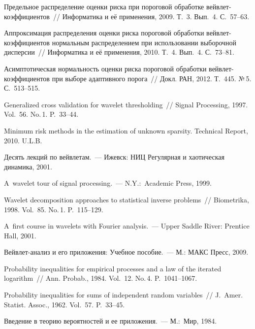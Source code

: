 \begin{multicols}{2}
{{\begin{thebibliography}{99}
 Предельное распределение оценки риска при пороговой обработке вейв\-лет-ко\-эф\-фи\-ци\-ен\-тов~// 
Информатика и её применения, 2009. Т.~3. Вып.~4. С.~57--63.

 Аппроксимация распределения оценки риска пороговой обработки вейв\-лет-ко\-эф\-фи\-ци\-ен\-тов 
нормальным распределением при использовании выборочной дисперсии~// Информатика и её применения, 2010. Т.~4. Вып.~4. С.~73--81.

 Асимптотическая нормальность оценки риска пороговой обработки вейв\-лет-ко\-эф\-фи\-ци\-ентов при 
выборе адаптивного порога~// Докл. РАН, 2012. Т.~445. №\,5. С.~513--515.



 Generalized cross validation for wavelet thre\-sholding~// Signal 
Processing, 1997. Vol.~56. No.\,1. P.~33--44.

 Minimum risk methods in the estimation of unknown sparsity. Technical Report, 2010. U.L.B.

 Десять лекций по вейвлетам.~--- Ижевск: НИЦ Регулярная и хаотическая динамика, 2001.

 A~wavelet tour of signal processing.~--- N.Y.:~Academic Press, 1999.

 Wavelet decomposition approaches to statistical inverse problems~// 
Biometrika, 1998. Vol.~85. No.\,1. P.~115--129.

  A~first course in wavelets with Fourier analysis.~--- Upper Saddle River: Prentice Hall, 2001.

 Вейв\-лет-ана\-лиз и его приложения: Учебное пособие.~--- М.: МАКС Пресс, 2009.

 Probability inequalities for empirical processes and a law of the iterated logarithm~// 
Ann. Probab., 1984. Vol.~12. No.\,4. P.~1041--1067.

  Probability inequalities for sums of independent random variables~// 
J.~Amer. Statist. Assoc., 1962. Vol.~57. P.~33--45.

  Введение в теорию вероятностей и ее приложения.~--- М.:~Мир, 1984.


\end{thebibliography}}}
\end{multicols}
